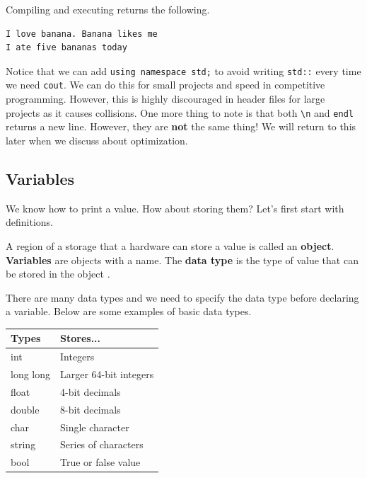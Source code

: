 \documentclass[../../../main.tex]{subfiles}
\begin{document}
Compiling and executing returns the following.

\begin{outputbox}
\begin{lstlisting}[style=basic]
I love banana. Banana likes me
I ate five bananas today
\end{lstlisting}
\end{outputbox}

Notice that we can add \verb|using namespace std;| to avoid writing
\verb|std::| every time we need \verb|cout|. We can do this for
small projects and speed in competitive programming. However, this
is highly discouraged in header files for large projects as it causes
collisions. One more thing to note is that both \verb|\n| and
\verb|endl| returns a new line. However, they are \textbf{not} the
same thing! We will return to this later when we discuss about
optimization.

\subsection{Variables}

We know how to print a value. How about storing them? Let's first
start with definitions.

\begin{definition}{}{}
A region of a storage that a hardware can store a value is called an
\textbf{object}. \textbf{Variables} are objects with a name.
The \textbf{data type} is the type of value that can be stored in the
object \cite{CS02-1}.
\end{definition}

There are many data types and we need to specify the data type
before declaring a variable. Below are some examples of basic
data types.

\begin{center}
\begin{tabular}{|p{}|p{}|}
    \hline
    \textbf{Types} & \textbf{Stores...} \\
    \hline
    int            & Integers \\
    \hline
    long long      & Larger 64-bit integers \\
    \hline
    float          & 4-bit decimals \\
    \hline
    double         & 8-bit decimals \\
    \hline
    char           & Single character \\
    \hline
    string         & Series of characters \\
    \hline
    bool           & True or false value \\
    \hline
\end{tabular}
\end{center}
\end{document}
